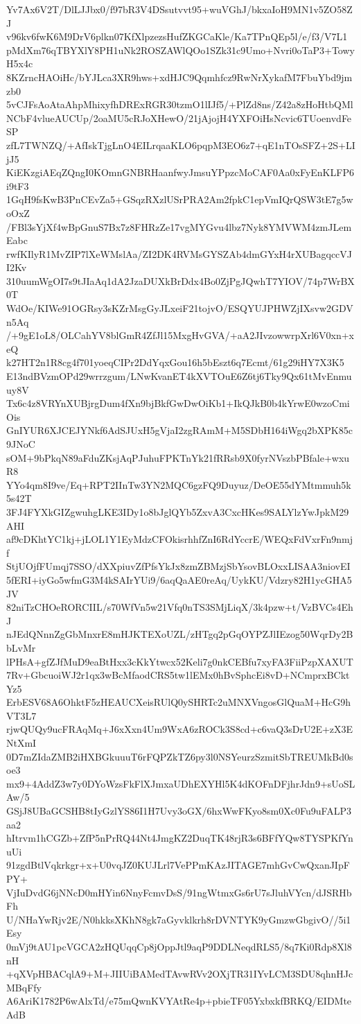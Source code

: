 Yv7Ax6V2T/DlLJJbx0/f97bR3V4DSsutvvt95+wuVGhJ/bkxaIoH9MN1v5ZO58ZJ
v96kv6fwK6M9DrV6plkn07KfXlpzezsHufZKGCaKle/Ka7TPnQEp5l/e/f3/V7L1
pMdXm76qTBYXlY8PH1uNk2ROSZAWlQOo1SZk31c9Umo+Nvri0oTaP3+TowyH5x4c
8KZrncHAOiHc/bYJLca3XR9hws+xdHJC9Qqmhfcz9RwNrXykafM7FbuYbd9jmzb0
5vCJFsAoAtaAhpMhixyfhDRExRGR30tzmO1lIJf5/+PlZd8ns/Z42a8zHoHtbQMl
NCbF4vlueAUCUp/2oaMU5cRJoXHewO/21jAjojH4YXFOiHsNcvic6TUoenvdFeSP
zfL7TWNZQ/+AfIskTjgLnO4EILrqaaKLO6pqpM3EO6z7+qE1nTOsSFZ+2S+LIjJ5
KiEKzgiAEqZQngI0KOmnGNBRHaanfwyJmsuYPpzcMoCAF0Aa0xFyEnKLFP6i9tF3
1GqH9fsKwB3PnCEvZa5+GSqzRXzlUSrPRA2Am2fpkC1epVmIQrQSW3tE7g5woOxZ
/FBl3sYjXf4wBpGnuS7Bx7z8FHRzZe17vgMYGvu4lbz7Nyk8YMVWM4zmJLemEabc
rwfKIlyR1MvZIP7lXeWMslAa/ZI2DK4RVMsGYSZAb4dmGYxH4rXUBagqccVJI2Kv
310uumWgOI7s9tJIaAq1dA2JzaDUXkBrDdx4Bo0ZjPgJQwhT7YIOV/74p7WrBX0T
WdOe/KIWe91OGRsy3sKZrMsgGyJLxeiF21tojvO/ESQYUJPHWZjIXsvw2GDVn5Aq
/+9gE1oL8/OLCahYV8blGmR4ZfJl15MxgHvGVA/+aA2JIvzowwrpXrl6V0xn+xeQ
k27HT2n1R8cg4f701yoeqCIPr2DdYqxGou16h5bEszt6q7Ecmt/61g29iHY7X3K5
E13ndBVzmOPd29wrrzgum/LNwKvanET4kXVTOuE6Z6tj6Tky9Qx61tMvEnmuuy8V
Tx6c4z8VRYnXUBjrgDum4fXn9bjBkfGwDwOiKb1+IkQJkB0b4kYrwE0wzoCmiOis
GnIYUR6XJCEJYNkf6AdSJUxH5gVjaI2zgRAmM+M5SDbH164iWgq2bXPK85c9JNoC
sOM+9bPkqN89aFduZKsjAqPJuhuFPKTnYk21fRRsb9X0fyrNVszbPBfale+wxuR8
YYo4qm8I9ve/Eq+RPT2IInTw3YN2MQC6gzFQ9Duyuz/DeOE55dYMtmmuh5k5s42T
3FJ4FYXkGIZgwuhgLKE3IDy1o8bJglQYb5ZxvA3CxcHKes9SALYlzYwJpkM29AHI
af9cDKhtYC1kj+jLOL1Y1EyMdzCFOkisrhhfZnI6RdYccrE/WEQxFdVxrFn9nmjf
StjUOjfFUmqj7SSO/dXXpiuvZfPfsYkJx8zmZBMzjSbYsovBLOxxLISAA3niovEI
5fERI+iyGo5wfmG3M4kSAIrYUi9/6aqQaAE0reAq/UykKU/Vdzry82H1ycGHA5JV
82niTzCHOeRORCIIL/s70WfVn5w21Vfq0nTS3SMjLiqX/3k4pzw+t/VzBVCs4EhJ
nJEdQNnnZgGbMnxrE8mHJKTEXoUZL/zHTgq2pGqOYPZJlIEzog50WqrDy2BbLvMr
lPHsA+gfZJfMuD9eaBtHxx3cKkYtwcx52Keli7g0nkCEBfu7xyFA3FiiPzpXAXUT
7Rv+GbcuoiWJ2r1qx3wBcMfaodCRS5tw1lEMx0hBvSphcEi8vD+NCmprxBCktYz5
ErbESV68A6OhktF5zHEAUCXeisRUlQ0ySHRTc2uMNXVngosGlQuaM+HcG9hVT3L7
rjwQUQy9ucFRAqMq+J6xXxn4Um9WxA6zROCk3S8cd+c6vaQ3sDrU2E+zX3ENtXmI
0D7mZIdaZMB2iHXBGkuuuT6rFQPZkTZ6py3l0NSYeurzSzmitSbTREUMkBd0soe3
mx9+4AddZ3w7y0DYoWzsFkFlXJmxaUDhEXYHl5K4dKOFnDFjhrJdn9+sUoSLAw/5
GSjJ8UBaGCSHB8tIyGzlYS86I1H7Uvy3oGX/6hxWwFKyo8sm0Xc0Fu9uFALP3aa2
hItrvm1hCGZb+ZfP5nPrRQ44Nt4JmgKZ2DuqTK48rjR3s6BFfYQw8TYSPKfYnuUi
91zgdBtlVqkrkgr+x+U0vqJZ0KUJLrl7VePPmKAzJITAGE7mhGvCwQxanJIpFPY+
VjIuDvdG6jNNcD0mHYin6NnyFcmvDsS/91ngWtmxGs6rU7sJluhVYcn/dJSRHbFh
U/NHaYwRjv2E/N0hkksXKhN8gk7aGyvklkrh8rDVNTYK9yGmzwGbgivO//5i1Esy
0mVj9tAU1pcVGCA2zHQUqqCp8jOppJtl9aqP9DDLNeqdRLS5/8q7Ki0Rdp8Xl8nH
+qXVpHBACqlA9+M+JIIUiBAMedTAvwRVv2OXjTR31IYvLCM3SDU8qhnHJcMBqFfy
A6AriK1782P6wAlxTd/e75mQwnKVYAtRe4p+pbieTF05YxbxkfBRKQ/EIDMteAdB
